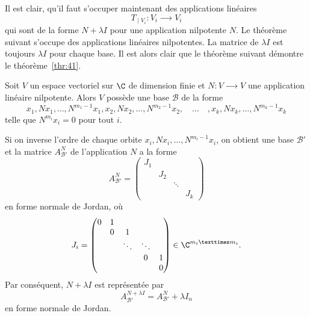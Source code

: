 Il est clair, qu'il faut s'occuper maintenant des applications linéaires 
\begin{displaymath}
  T_{∣V_i} \colon V_i ⟶ V_i 
\end{displaymath}
qui sont de la forme $N + λ I$ pour une application nilpotente $N$. Le théorème suivant s'occupe des applications linéaires nilpotentes. La matrice de $λI$ est toujours $λ I$ pour chaque base. Il est alors clair que le théorème suivant démontre le théorème~\ref{thr:41}. 

\begin{theorem}
  \label{thr:38}
  Soit $V$ un espace vectoriel sur $\C$ de dimension finie et $N\colon V ⟶V$  une application linéaire nilpotente.  Alors $V$ possède une base $ℬ$ de la forme 
  \begin{displaymath}
    x_1,Nx_1, \dots, N^{m_1-1}x_1, x_2,Nx_2, \ldots , N^{m_2-1}x_2, \quad \dots \quad , x_k,Nx_k, \dots, N^{m_k-1}x_k
  \end{displaymath}
telle que $N^{m_i}x_i = 0$ pour tout $i$. 
\end{theorem}

\begin{remark}
  \label{rem:4}
  Si on inverse l'ordre de chaque orbite $x_i, Nx_i, \dots, N^{m_i-1} x_i$,
  on obtient une base $ℬ'$ et la matrice $A_{ℬ'}^{N }$ de l'application $N$  a la forme 
  \begin{displaymath}
    A_{ℬ'}^N =
    \begin{pmatrix}
      J_1 \\
      & J_2 \\
      & & \ddots \\
      & & & J_k
    \end{pmatrix}
  \end{displaymath}
en forme normale de Jordan, où 
\begin{displaymath}
  J_i =
  \begin{pmatrix}
    0 & 1 \\
    &  0 & 1 \\
    &    & \ddots & \ddots \\
    &    &        & 0 & 1 \\
    & & & & 0
  \end{pmatrix} \in \C^{m_i × m_i}. 
\end{displaymath}
Par conséquent, $N+ λI$ est représentée par 
\begin{displaymath}
 A_{ℬ'}^{N + λI} =    A_{ℬ'}^N + λ I_n
\end{displaymath}
en forme normale de Jordan. 
\end{remark}


